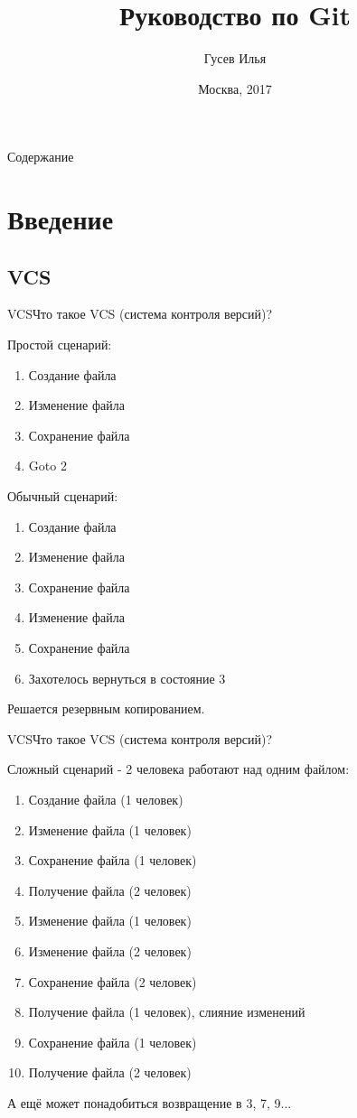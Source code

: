 \documentclass[10pt]{beamer}
\title[\href{https://goo.gl/NRgp8K}{https://goo.gl/NRgp8K} (Term 3)]{Руководство по Git}
\author[Гусев Илья]{Гусев Илья}
\institute[МФТИ] 
{Московский физико-технический институт\\*}
\date{Москва, 2017}
\begin{document}
\begin{frame}
  \titlepage
\end{frame}

\begin{frame}{Содержание}
\tableofcontents
\end{frame}

\section{Введение}

\subsection{VCS}
\begin{frame}[fragile]{VCS}{Что такое VCS (система контроля версий)?}
\begin{multicols}{2}
Простой сценарий:
\begin{enumerate}
\item Создание файла
\item Изменение файла
\item Сохранение файла
\item Goto 2
\end{enumerate}
\vfill\eject
Обычный сценарий:
\begin{enumerate}
\item Создание файла
\item Изменение файла
\item Сохранение файла
\item Изменение файла
\item Сохранение файла
\item Захотелось вернуться в состояние 3
\end{enumerate}
Решается резервным копированием.
\end{multicols}
\end{frame}

\begin{frame}[fragile]{VCS}{Что такое VCS (система контроля версий)?}
\begin{multicols}{2}
Сложный сценарий - 2 человека работают над одним файлом:
\begin{enumerate}
\item Создание файла (1 человек)
\item Изменение файла (1 человек)
\item Сохранение файла (1 человек)
\item Получение файла (2 человек)
\item Изменение файла (1 человек)
\item Изменение файла (2 человек)
\item Сохранение файла (2 человек)
\item Получение файла (1 человек), слияние изменений
\item Сохранение файла (1 человек)
\item Получение файла (2 человек)
\end{enumerate}
\end{multicols}
А ещё может понадобиться возвращение в 3, 7, 9...
\end{frame}
\end{document}
